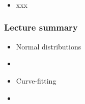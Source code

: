 \documentclass[english,14pt]{beamer}
\begin{document}

\begin{frame}[fragile]

\frametitle{}

\begin{itemize}
	\item xxx
\end{itemize}

\end{frame}


\begin{frame}[fragile]

\frametitle{Lecture summary}
\begin{itemize}
	\item Normal distributions
	\item[]
	
	\item Curve-fitting
	\item[]
	
\end{itemize}

\end{frame}
\end{document}
